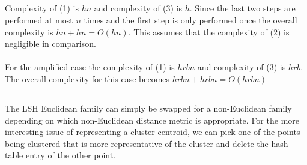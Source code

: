 \documentclass[letterpaper]{article}
\begin{document}
\subsection{}

Complexity of (1) is $hn$ and complexity of (3) is $h$. Since the last two steps are 
performed at most $n$ times and the first step is only performed once the overall complexity is $hn + hn = O(hn)$.
This assumes that the complexity of (2) is negligible in comparison.\\\\ 
For the amplified case the complexity of (1) is $hrbn$ and complexity of (3) is $hrb$. The
overall complexity for this case becomes $hrbn + hrbn = O(hrbn)$

\subsection{}

The LSH Euclidean family can simply be swapped for a non-Euclidean family depending on
which non-Euclidean distance metric is appropriate. For the more interesting issue of
representing a cluster centroid, we can pick one of the points being clustered that is more
representative of the cluster and delete the hash table entry of the other point.





\end{document}
